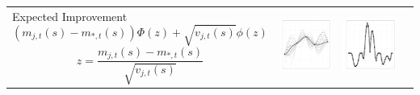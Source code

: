 \documentclass[a4paper,natbib]{apa6}
\begin{document}
\begin{table}[h!]
\begin{tabular}{lccc}
\parbox[b]{5cm}{Expected Improvement $$\left(m_{j,t}(s)-m_{*,t}(s)\right)\Phi(z)+\sqrt{v_{j,t}(s)}\phi(z)$$
$$z=\frac{m_{j,t}(s)-m_{*,t}(s)}{\sqrt{v_{j,t}(s)}}$$\\}&
\includegraphics[scale=0.2]{figure15.pdf} &  
\includegraphics[scale=0.2]{figure16.pdf} &  

\end{tabular}
\end{table}
\end{document}
